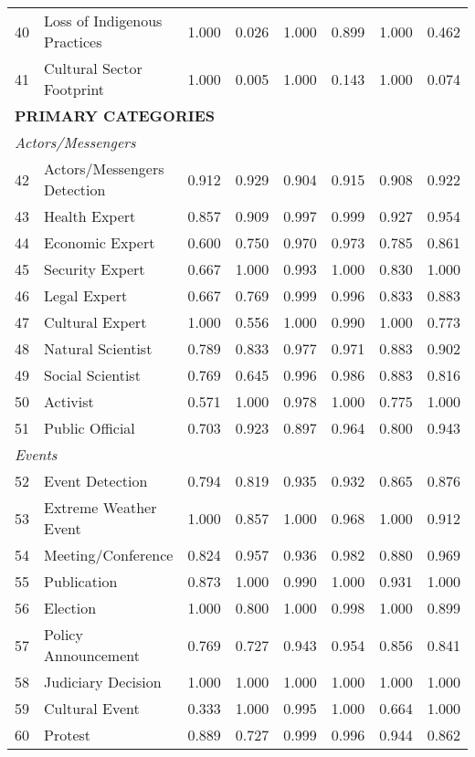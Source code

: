 \documentclass[12pt]{article}
\begin{document}
{\begin{longtable}{p{0.4cm}p{5.5cm}rrrrrr}
40 & Loss of Indigenous Practices & 1.000 & 0.026 & 1.000 & 0.899 & 1.000 & 0.462 \\
41 & Cultural Sector Footprint & 1.000 & 0.005 & 1.000 & 0.143 & 1.000 & 0.074 \\
\multicolumn{8}{l}{\cellcolor{gray!10}\textbf{PRIMARY CATEGORIES}} \\
\midrule
\multicolumn{8}{l}{\textit{Actors/Messengers}} \\
42 & Actors/Messengers Detection & 0.912 & 0.929 & 0.904 & 0.915 & 0.908 & 0.922 \\
43 & Health Expert & 0.857 & 0.909 & 0.997 & 0.999 & 0.927 & 0.954 \\
44 & Economic Expert & 0.600 & 0.750 & 0.970 & 0.973 & 0.785 & 0.861 \\
45 & Security Expert & 0.667 & 1.000 & 0.993 & 1.000 & 0.830 & 1.000 \\
46 & Legal Expert & 0.667 & 0.769 & 0.999 & 0.996 & 0.833 & 0.883 \\
47 & Cultural Expert & 1.000 & 0.556 & 1.000 & 0.990 & 1.000 & 0.773 \\
48 & Natural Scientist & 0.789 & 0.833 & 0.977 & 0.971 & 0.883 & 0.902 \\
49 & Social Scientist & 0.769 & 0.645 & 0.996 & 0.986 & 0.883 & 0.816 \\
50 & Activist & 0.571 & 1.000 & 0.978 & 1.000 & 0.775 & 1.000 \\
51 & Public Official & 0.703 & 0.923 & 0.897 & 0.964 & 0.800 & 0.943 \\
\multicolumn{8}{l}{\textit{Events}} \\
52 & Event Detection & 0.794 & 0.819 & 0.935 & 0.932 & 0.865 & 0.876 \\
53 & Extreme Weather Event & 1.000 & 0.857 & 1.000 & 0.968 & 1.000 & 0.912 \\
54 & Meeting/Conference & 0.824 & 0.957 & 0.936 & 0.982 & 0.880 & 0.969 \\
55 & Publication & 0.873 & 1.000 & 0.990 & 1.000 & 0.931 & 1.000 \\
56 & Election & 1.000 & 0.800 & 1.000 & 0.998 & 1.000 & 0.899 \\
57 & Policy Announcement & 0.769 & 0.727 & 0.943 & 0.954 & 0.856 & 0.841 \\
58 & Judiciary Decision & 1.000 & 1.000 & 1.000 & 1.000 & 1.000 & 1.000 \\
59 & Cultural Event & 0.333 & 1.000 & 0.995 & 1.000 & 0.664 & 1.000 \\
60 & Protest & 0.889 & 0.727 & 0.999 & 0.996 & 0.944 & 0.862 \\

\end{longtable}}
\end{document}
